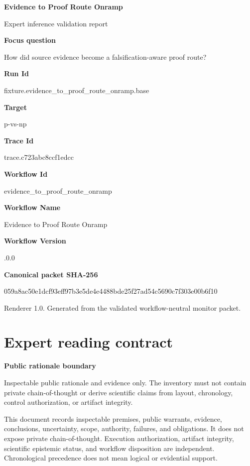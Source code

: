 \documentclass[10pt,a4paper]{article}
\newcommand{\TraceField}[2]{\par\noindent\textbf{#1}\par\noindent #2\par\smallskip}
\begin{document}
\hypersetup{pageanchor=false}
\begin{titlepage}
\centering
{\LARGE\bfseries Evidence to Proof Route Onramp\par}
\vspace{1em}
{\large Expert inference validation report\par}
\vspace{2em}
\begin{minipage}{0.92\linewidth}
\TraceField{Focus question}{How did source evidence become a falsificat\allowbreak{}ion-\allowbreak{}aware proof route?}

\TraceField{Run Id}{fixture.\allowbreak{}evidence\_\allowbreak{}to\_\allowbreak{}proof\_\allowbreak{}route\_\allowbreak{}onramp.\allowbreak{}base}

\TraceField{Target}{p-\allowbreak{}vs-\allowbreak{}np}

\TraceField{Trace Id}{trace.\allowbreak{}c723abc8cc\allowbreak{}f1edcc}

\TraceField{Workflow Id}{evidence\_\allowbreak{}to\_\allowbreak{}proof\_\allowbreak{}route\_\allowbreak{}onramp}

\TraceField{Workflow Name}{Evidence to Proof Route Onramp}

\TraceField{Workflow Version}{1.\allowbreak{}0.\allowbreak{}0}

\TraceField{Canonical packet SHA-256}{059a8ac50e\allowbreak{}1dcf93eff9\allowbreak{}7b3e5de4e4\allowbreak{}488bde25f2\allowbreak{}7ad54c5690\allowbreak{}c7f303e00b\allowbreak{}6f10}

\end{minipage}
\vfill
{\small Renderer 1.0. Generated from the validated workflow-neutral monitor packet.}
\end{titlepage}
\tableofcontents\clearpage
\hypersetup{pageanchor=true}
\section{Expert reading contract}\label{sec-reading-contract}
\TraceField{Public rationale boundary}{Inspectabl\allowbreak{}e public rationale and evidence only.\allowbreak{} The inventory must not contain private chain-\allowbreak{}of-\allowbreak{}thought or derive scientific\allowbreak{} claims from layout, chronology\allowbreak{}, control authorizat\allowbreak{}ion, or artifact integrity.\allowbreak{}}

This document records inspectable premises, public warrants, evidence, conclusions,
uncertainty, scope, authority, failures, and obligations. It does not expose private
chain-of-thought. Execution authorization, artifact integrity, scientific epistemic
status, and workflow disposition are independent. Chronological precedence does not
mean logical or evidential support.
\end{document}
